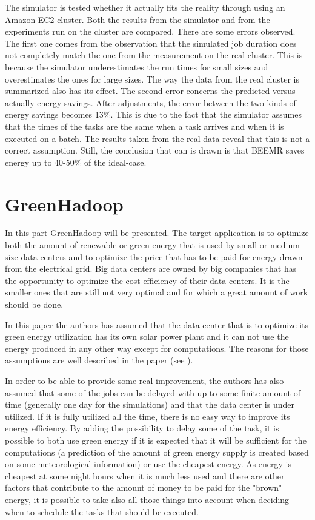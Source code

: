 \documentclass[9pt, a4paper]{article}
\theoremstyle{plain}
\begin{document}
The simulator is tested whether it actually fits the reality through using an Amazon EC2
cluster. Both the results from the simulator and from the experiments run on the
cluster are compared. There are some errors observed. The first one comes from the
observation that the simulated job duration does not completely match the one from
the measurement on the real cluster. This is because the simulator underestimates
the run times for small sizes and overestimates the ones for large sizes. The way
the data from the real cluster is summarized also has its effect. The second error
concerns the predicted versus actually energy savings. After adjustments, the
error between the two kinds of energy savings becomes 13\%. This is due to the fact that
the simulator assumes that the times of the tasks are the same when a task arrives
and when it is executed on a batch. The results taken from the real data reveal
that this is not a correct assumption. Still, the conclusion that can is drawn is
that BEEMR saves energy up to 40-50\% of the ideal-case.

\section{GreenHadoop} %
\label{sec:GreenHadoop}
  In this part GreenHadoop will be presented. The target application is to
  optimize both the amount of renewable or green energy that is used by small or
  medium size data centers and to optimize the price that has to be paid for
  energy drawn from the electrical grid. Big data centers are owned by big
  companies that has the opportunity to optimize the cost efficiency of their
  data centers. It is the smaller ones that are still not very optimal and for
  which a great amount of work should be done.

  In this paper the authors has assumed that the data center that is to optimize
  its green energy utilization has its own solar power plant and it can not use
  the energy produced in any other way except for computations. The reasons for
  those assumptions are well described in the paper (see \cite{greenhadoop}). 

  In order to be able to provide some real improvement, the authors has also
  assumed that some of the jobs can be delayed with up to some finite amount of
  time (generally one day for the simulations) and that the data center is under
  utilized. If it is fully utilized all the time, there is no easy way to
  improve its energy efficiency. By adding the possibility to delay some of the
  task, it is possible to both use green energy if it is expected that it will
  be sufficient for the computations (a prediction of the amount of green energy
  supply is created based on some meteorological information) or use the
  cheapest energy. As energy is cheapest at some night hours when it is much
  less used and there are other factors that contribute to the amount of money
  to be paid for the "brown" energy, it is possible to take also all those
  things into account when deciding when to schedule the tasks that should be
  executed.
\end{document}
